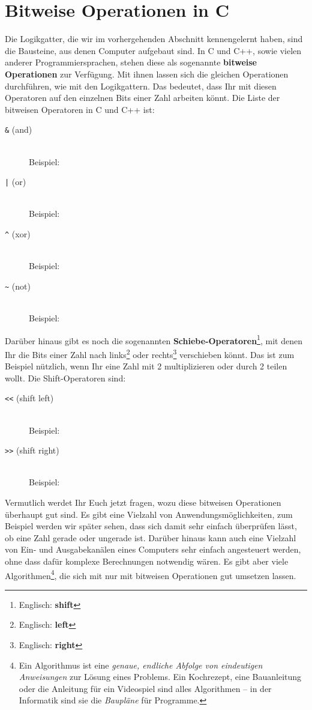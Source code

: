 \section{Bitweise Operationen in C}
\label{sec:grundlagen:bitweise-operationen}

Die Logikgatter, die wir im vorhergehenden Abschnitt kennengelernt haben, sind die Bausteine, aus denen Computer aufgebaut sind. In C und C++, sowie vielen anderer Programmiersprachen, stehen diese als sogenannte \textbf{bitweise Operationen} zur Verfügung. Mit ihnen lassen sich die gleichen Operationen durchführen, wie mit den Logikgattern. Das bedeutet, dass Ihr mit diesen Operatoren auf den einzelnen Bits einer Zahl arbeiten könnt.
Die Liste der bitweisen Operatoren in C und C++ ist:
\begin{description}
  \item[\texttt{\&} (and)]\hfill\\
    Beispiel: 
  \item[\texttt{|} (or)]\hfill\\
    Beispiel: 
  \item[\texttt{\^} (xor)]\hfill\\
    Beispiel: 
  \item[\texttt{\~} (not)]\hfill\\
    Beispiel: 
\end{description}
Darüber hinaus gibt es noch die sogenannten \textbf{Schiebe-Operatoren}\footnote{Englisch: \textbf{shift}}, mit denen Ihr die Bits einer Zahl nach links\footnote{Englisch: \textbf{left}} oder rechts\footnote{Englisch: \textbf{right}} verschieben könnt. Das ist zum Beispiel nützlich, wenn Ihr eine Zahl mit 2 multiplizieren oder durch 2 teilen wollt. Die Shift-Operatoren sind:
\begin{description}
  \item[\texttt{<<} (shift left)]\hfill\\
    Beispiel: 
  \item[\texttt{>>} (shift right)]\hfill\\
    Beispiel: 
\end{description}

\noindent
Vermutlich werdet Ihr Euch jetzt fragen, wozu diese bitweisen Operationen überhaupt gut sind. Es gibt eine Vielzahl von Anwendungsmöglichkeiten, zum Beispiel werden wir später sehen, dass sich damit sehr einfach überprüfen lässt, ob eine Zahl gerade oder ungerade ist. Darüber hinaus kann auch eine Vielzahl von Ein- und Ausgabekanälen eines Computers sehr einfach angesteuert werden, ohne dass dafür komplexe Berechnungen notwendig wären. Es gibt aber viele Algorithmen\footnote{%
  Ein Algorithmus ist eine \emph{genaue, endliche Abfolge von eindeutigen Anweisungen} 
  zur Lösung eines Problems. Ein Kochrezept, eine Bauanleitung oder die Anleitung 
  für ein Videospiel sind alles Algorithmen – in der Informatik sind sie die 
  \emph{Baupläne} für Programme. 
}, die sich mit nur mit bitweisen Operationen gut umsetzen lassen.

